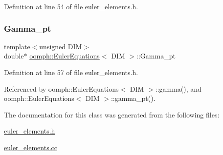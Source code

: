 Definition at line 54 of file euler\+\_\+elements.\+h.

\mbox{\label{classoomph_1_1EulerEquations_a5dd362769200e19bd966d85c883beaa0}} 
\subsubsection{\texorpdfstring{Gamma\+\_\+pt}{Gamma\_pt}}
{\footnotesize\ttfamily template$<$unsigned D\+IM$>$ \\
double$\ast$ \hyperlink{classoomph_1_1EulerEquations}{oomph\+::\+Euler\+Equations}$<$ D\+IM $>$\+::Gamma\+\_\+pt\hspace{0.3cm}{\ttfamily [private]}}



Definition at line 57 of file euler\+\_\+elements.\+h.



Referenced by oomph\+::\+Euler\+Equations$<$ D\+I\+M $>$\+::gamma(), and oomph\+::\+Euler\+Equations$<$ D\+I\+M $>$\+::gamma\+\_\+pt().



The documentation for this class was generated from the following files\+:\begin{DoxyCompactItemize}
\item 
\hyperlink{euler__elements_8h}{euler\+\_\+elements.\+h}\item 
\hyperlink{euler__elements_8cc}{euler\+\_\+elements.\+cc}\end{DoxyCompactItemize}
